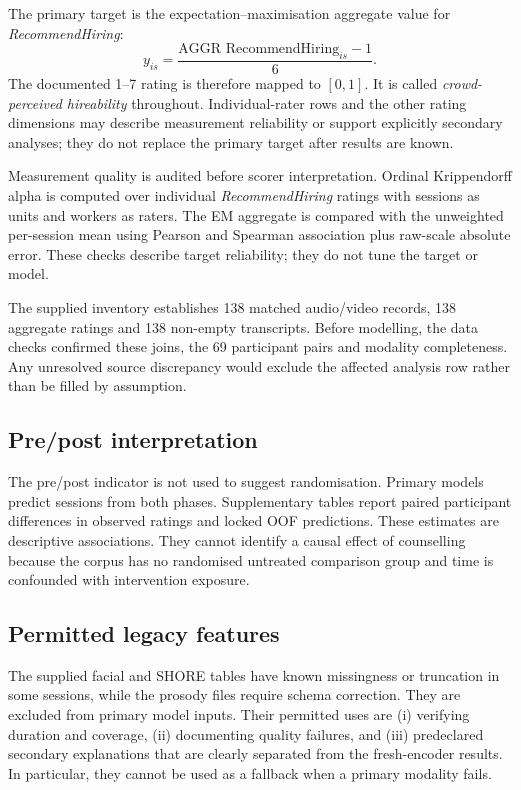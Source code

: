 The primary target is the expectation--maximisation aggregate value for
\emph{RecommendHiring}:
\begin{equation}
    y_{is}=\frac{\text{AGGR RecommendHiring}_{is}-1}{6}.
\end{equation}
The documented 1--7 rating is therefore mapped to $[0,1]$. It is called
\emph{crowd-perceived hireability} throughout. Individual-rater rows and the other
rating dimensions may describe measurement reliability or support explicitly secondary analyses;
they do not replace the primary target after results are known.

Measurement quality is audited before scorer interpretation. Ordinal Krippendorff alpha is
computed over individual \emph{RecommendHiring} ratings with sessions as units and workers as
raters. The EM aggregate is compared with the unweighted per-session mean using Pearson and
Spearman association plus raw-scale absolute error. These checks describe target reliability; they
do not tune the target or model.

The supplied inventory establishes 138 matched audio/video records, 138 aggregate ratings and
138 non-empty transcripts. Before modelling, the data checks confirmed these joins, the 69
participant pairs and modality completeness. Any unresolved source discrepancy would exclude
the affected analysis row rather than be filled by assumption.

\subsection{Pre/post interpretation}

The pre/post indicator is not used to suggest randomisation. Primary models predict sessions from
both phases. Supplementary tables report paired participant differences in observed ratings and
locked OOF predictions. These estimates are descriptive associations. They cannot identify a
causal effect of counselling because the corpus has no randomised untreated comparison group and
time is confounded with intervention exposure.

\subsection{Permitted legacy features}

The supplied facial and SHORE tables have known missingness or truncation in some sessions, while
the prosody files require schema correction. They are excluded from primary model inputs. Their
permitted uses are (i) verifying duration and coverage, (ii) documenting quality failures, and
(iii) predeclared secondary explanations that are clearly separated from the fresh-encoder
results. In particular, they cannot be used as a fallback when a primary modality fails.


